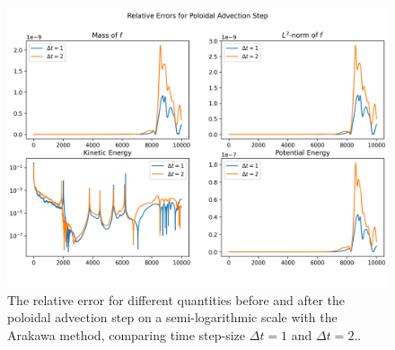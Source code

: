 \begin{figure}
	\centering
	\includegraphics[width=0.9\linewidth]{plots/rel_err akw}
	\caption{The relative error for different quantities before and after the poloidal advection step on a semi-logarithmic scale with the Arakawa method, comparing time step-size $\Delta t = 1$ and $\Delta t = 2$..}
	\label{fig:relerr_akw}
\end{figure}



